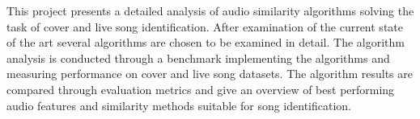 

\begin{abstracts}


This project presents a detailed analysis of audio similarity algorithms solving
the task of cover and live song identification. After examination of the current
state of the art several algorithms are chosen to be examined in detail. The
algorithm analysis is conducted through a benchmark implementing the algorithms
and measuring performance on cover and live song datasets. The algorithm results
are compared through evaluation metrics and give an overview of best performing
audio features and similarity methods suitable for song identification.


\end{abstracts}
